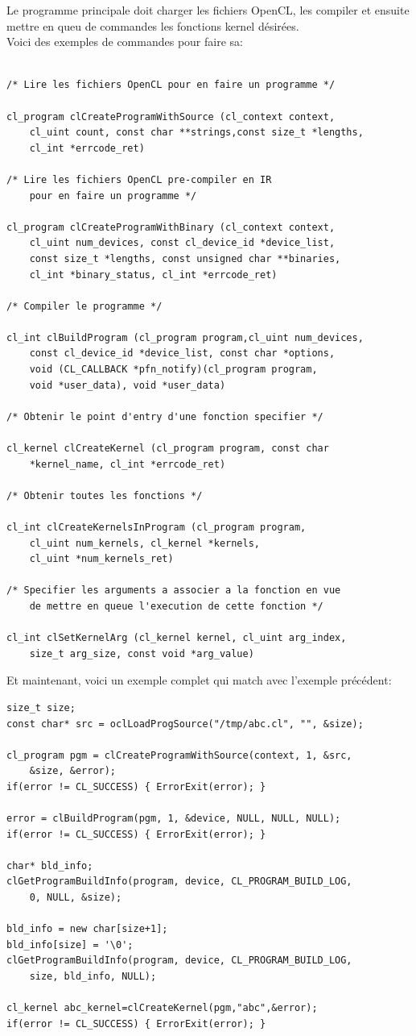 \documentclass[oneside]{book}
\begin{document}
Le programme principale doit charger les fichiers OpenCL, les compiler et ensuite mettre en queu de commandes les fonctions kernel désirées.\\

Voici des exemples de commandes pour faire sa:\\

\begin{lstlisting}

/* Lire les fichiers OpenCL pour en faire un programme */

cl_program clCreateProgramWithSource (cl_context context,
	cl_uint count, const char **strings,const size_t *lengths,
	cl_int *errcode_ret)

/* Lire les fichiers OpenCL pre-compiler en IR
	pour en faire un programme */

cl_program clCreateProgramWithBinary (cl_context context,
	cl_uint num_devices, const cl_device_id *device_list,
	const size_t *lengths, const unsigned char **binaries,
	cl_int *binary_status, cl_int *errcode_ret)

/* Compiler le programme */

cl_int clBuildProgram (cl_program program,cl_uint num_devices,
	const cl_device_id *device_list, const char *options,
	void (CL_CALLBACK *pfn_notify)(cl_program program,
	void *user_data), void *user_data)
	
/* Obtenir le point d'entry d'une fonction specifier */

cl_kernel clCreateKernel (cl_program program, const char
	*kernel_name, cl_int *errcode_ret)

/* Obtenir toutes les fonctions */

cl_int clCreateKernelsInProgram (cl_program program,
	cl_uint num_kernels, cl_kernel *kernels,
	cl_uint *num_kernels_ret)

/* Specifier les arguments a associer a la fonction en vue
	de mettre en queue l'execution de cette fonction */

cl_int clSetKernelArg (cl_kernel kernel, cl_uint arg_index,
	size_t arg_size, const void *arg_value)
\end{lstlisting}

Et maintenant, voici un exemple complet qui match avec l'exemple précédent:
\begin{lstlisting}
size_t size;
const char* src = oclLoadProgSource("/tmp/abc.cl", "", &size);

cl_program pgm = clCreateProgramWithSource(context, 1, &src,
	&size, &error);
if(error != CL_SUCCESS) { ErrorExit(error); }

error = clBuildProgram(pgm, 1, &device, NULL, NULL, NULL);
if(error != CL_SUCCESS) { ErrorExit(error); }

char* bld_info;
clGetProgramBuildInfo(program, device, CL_PROGRAM_BUILD_LOG,
	0, NULL, &size);

bld_info = new char[size+1]; 
bld_info[size] = '\0';
clGetProgramBuildInfo(program, device, CL_PROGRAM_BUILD_LOG,
	size, bld_info, NULL);

cl_kernel abc_kernel=clCreateKernel(pgm,"abc",&error);
if(error != CL_SUCCESS) { ErrorExit(error); }
\end{lstlisting}
\end{document}
